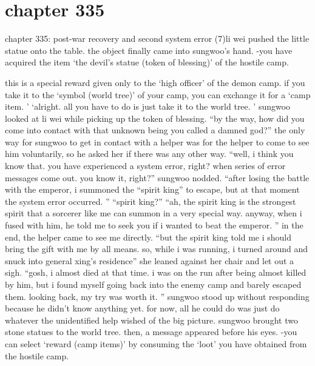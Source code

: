 \section{chapter 335}

chapter 335: post-war recovery and second system error (7)li wei pushed the little statue onto the table.
 the object finally came into sungwoo’s hand.
 -you have acquired the item ‘the devil’s statue (token of blessing)’ of the hostile camp.





this is a special reward given only to the ‘high officer’ of the demon camp.
 if you take it to the ‘symbol (world tree)’ of your camp, you can exchange it for a ‘camp item.
’ ‘alright.
 all you have to do is just take it to the world tree.
’ sungwoo looked at li wei while picking up the token of blessing.
 “by the way, how did you come into contact with that unknown being you called a damned god?” the only way for sungwoo to get in contact with a helper was for the helper to come to see him voluntarily, so he asked her if there was any other way.
 “well, i think you know that.
 you have experienced a system error, right? when series of error messages come out.
 you know it, right?” sungwoo nodded.
 “after losing the battle with the emperor, i summoned the “spirit king” to escape, but at that moment the system error occurred.
” “spirit king?” “ah, the spirit king is the strongest spirit that a sorcerer like me can summon in a very special way.
 anyway, when i fused with him, he told me to seek you if i wanted to beat the emperor.
” in the end, the helper came to see me directly.
 “but the spirit king told me i should bring the gift with me by all means.
 so, while i was running, i turned around and snuck into general xing’s residence” she leaned against her chair and let out a sigh.
 “gosh, i almost died at that time.
 i was on the run after being almost killed by him, but i found myself going back into the enemy camp and barely escaped them.
 looking back, my try was worth it.
” sungwoo stood up without responding because he didn’t know anything yet.
 for now, all he could do was just do whatever the unidentified help wished of the big picture.
sungwoo brought two stone statues to the world tree.
 then, a message appeared before his eyes.
 -you can select ‘reward (camp items)’ by consuming the ‘loot’ you have obtained from the hostile camp.

